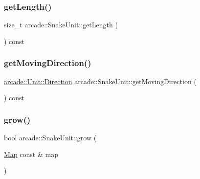 \subsubsection{\texorpdfstring{get\+Length()}{getLength()}}
{\footnotesize\ttfamily size\+\_\+t arcade\+::\+Snake\+Unit\+::get\+Length (\begin{DoxyParamCaption}{ }\end{DoxyParamCaption}) const}

\mbox{\label{classarcade_1_1_snake_unit_a26e52c313c70b4dbc62f0a00f1d29b01}} 
\subsubsection{\texorpdfstring{get\+Moving\+Direction()}{getMovingDirection()}}
{\footnotesize\ttfamily \hyperlink{classarcade_1_1_unit_af418afeaba1f7fd5934b6ae1343215dd}{arcade\+::\+Unit\+::\+Direction} arcade\+::\+Snake\+Unit\+::get\+Moving\+Direction (\begin{DoxyParamCaption}{ }\end{DoxyParamCaption}) const}

\mbox{\label{classarcade_1_1_snake_unit_a66b1ed720c9934352f2b23c29ad12b35}} 
\subsubsection{\texorpdfstring{grow()}{grow()}}
{\footnotesize\ttfamily bool arcade\+::\+Snake\+Unit\+::grow (\begin{DoxyParamCaption}\item[{\hyperlink{classarcade_1_1_map}{Map} const \&}]{map }\end{DoxyParamCaption})}

\mbox{\label{classarcade_1_1_snake_unit_ac291cd07b71f42589e29157fdcf52416}} 
